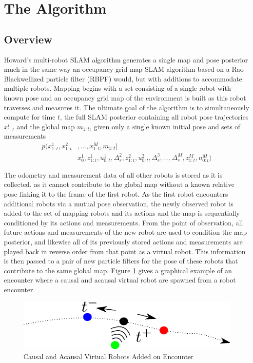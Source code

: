 \section{The Algorithm}
\label{S:Alg}

\subsection{Overview}
\label{SS:Alg:Overview} 


Howard's multi-robot SLAM algorithm generates a single map and pose posterior much in the same way an occupancy grid map SLAM algorithm based on a Rao-Blackwellized particle filter (RBPF) would, but with additions to accommodate multiple robots. Mapping begins with a set consisting of a single robot with known pose and an occupancy grid map of the environment is built as this robot traverses and measures it. The ultimate goal of the algorithm is to simultaneously compute for time $t$, the full SLAM posterior containing all robot pose trajectories $x_{1:t}^i$ and the global map $m_{1:t}$, given only a single known initial pose and sets of measurements
\begin{align*}
p(x_{1:t}^1,x_{1:t}^2&,...,x_{1:t}^M,m_{1:t}|\\&x_0^1,z_{1:t}^1,u_{0:t}^1,\Delta_s^2,z_{1:t}^2,u_{0:t}^2,\Delta_s^3,...,\Delta_s^M,z_{1:t}^M,u_{0:t}^M)
\end{align*}

The odometry and measurement data of all other robots is stored as it is collected, as it cannot contribute to the global map without a known relative pose linking it to the frame of the first robot. As the first robot encounters additional robots via a mutual pose observation, the newly observed robot is added to the set of mapping robots and its actions and the map is sequentially conditioned by its actions and measurements. From the point of observation, all future actions and measurements of the new robot are used to condition the map posterior, and likewise all of its previously stored actions and measurements are played back in reverse order from that point as a virtual robot. This information is then passed to a pair of new particle filters for the pose of these robots that contribute to the same global map. Figure \ref{fig:forwardbackward} gives a graphical example of an encounter where a causal and acausal virtual robot are spawned from a robot encounter.
\begin{figure}[ht]
\centering
\includegraphics[width=\columnwidth]{../FinalFigures/ForwardBackward.pdf}
\caption{Causal and Acausal Virtual Robots Added on Encounter}
\label{fig:forwardbackward}
\end{figure}

